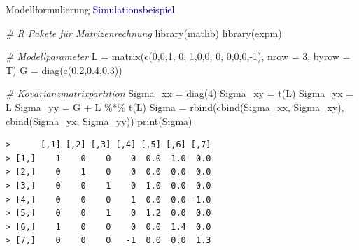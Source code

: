 \documentclass[
  8pt,
  ignorenonframetext,
]{beamer}
\newenvironment{Shaded}{\begin{snugshade}}{\end{snugshade}}
\newcommand{\AttributeTok}[1]{\textcolor[rgb]{0.77,0.63,0.00}{#1}}
\newcommand{\CommentTok}[1]{\textcolor[rgb]{0.56,0.35,0.01}{\textit{#1}}}
\newcommand{\DecValTok}[1]{\textcolor[rgb]{0.00,0.00,0.81}{#1}}
\newcommand{\FloatTok}[1]{\textcolor[rgb]{0.00,0.00,0.81}{#1}}
\newcommand{\FunctionTok}[1]{\textcolor[rgb]{0.00,0.00,0.00}{#1}}
\newcommand{\NormalTok}[1]{#1}
\newcommand{\OtherTok}[1]{\textcolor[rgb]{0.56,0.35,0.01}{#1}}
\newcommand{\SpecialCharTok}[1]{\textcolor[rgb]{0.00,0.00,0.00}{#1}}
\begin{document}
\begin{frame}[fragile]{Modellformulierung}
\protect\hypertarget{modellformulierung-11}{}
\textcolor{darkblue}{Simulationsbeispiel} \vspace{2mm}

\tiny
{}

\begin{Shaded}
\begin{Highlighting}[]
\CommentTok{\# R Pakete für Matrizenrechnung}
\FunctionTok{library}\NormalTok{(matlib)}
\FunctionTok{library}\NormalTok{(expm)}

\CommentTok{\# Modellparameter}
\NormalTok{L }\OtherTok{=} \FunctionTok{matrix}\NormalTok{(}\FunctionTok{c}\NormalTok{(}\DecValTok{0}\NormalTok{,}\DecValTok{0}\NormalTok{,}\DecValTok{1}\NormalTok{, }\DecValTok{0}\NormalTok{,}
             \DecValTok{1}\NormalTok{,}\DecValTok{0}\NormalTok{,}\DecValTok{0}\NormalTok{, }\DecValTok{0}\NormalTok{,}
             \DecValTok{0}\NormalTok{,}\DecValTok{0}\NormalTok{,}\DecValTok{0}\NormalTok{,}\SpecialCharTok{{-}}\DecValTok{1}\NormalTok{),}
           \AttributeTok{nrow  =} \DecValTok{3}\NormalTok{,}
           \AttributeTok{byrow =}\NormalTok{ T)}
\NormalTok{G }\OtherTok{=} \FunctionTok{diag}\NormalTok{(}\FunctionTok{c}\NormalTok{(}\FloatTok{0.2}\NormalTok{,}\FloatTok{0.4}\NormalTok{,}\FloatTok{0.3}\NormalTok{))}

\CommentTok{\# Kovarianzmatrixpartition}
\NormalTok{Sigma\_xx }\OtherTok{=} \FunctionTok{diag}\NormalTok{(}\DecValTok{4}\NormalTok{)}
\NormalTok{Sigma\_xy }\OtherTok{=} \FunctionTok{t}\NormalTok{(L)}
\NormalTok{Sigma\_yx }\OtherTok{=}\NormalTok{ L}
\NormalTok{Sigma\_yy }\OtherTok{=}\NormalTok{ G }\SpecialCharTok{+}\NormalTok{ L }\SpecialCharTok{\%*\%} \FunctionTok{t}\NormalTok{(L)}
\NormalTok{Sigma    }\OtherTok{=} \FunctionTok{rbind}\NormalTok{(}\FunctionTok{cbind}\NormalTok{(Sigma\_xx, Sigma\_xy), }\FunctionTok{cbind}\NormalTok{(Sigma\_yx, Sigma\_yy))}
\FunctionTok{print}\NormalTok{(Sigma)}
\end{Highlighting}
\end{Shaded}

\begin{verbatim}
>      [,1] [,2] [,3] [,4] [,5] [,6] [,7]
> [1,]    1    0    0    0  0.0  1.0  0.0
> [2,]    0    1    0    0  0.0  0.0  0.0
> [3,]    0    0    1    0  1.0  0.0  0.0
> [4,]    0    0    0    1  0.0  0.0 -1.0
> [5,]    0    0    1    0  1.2  0.0  0.0
> [6,]    1    0    0    0  0.0  1.4  0.0
> [7,]    0    0    0   -1  0.0  0.0  1.3
\end{verbatim}
\end{frame}
\end{document}
